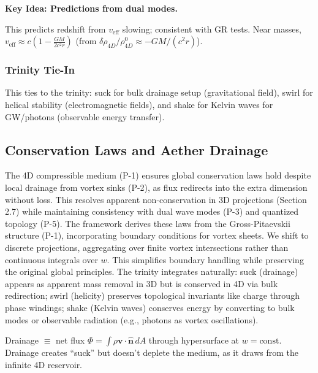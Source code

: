 \textbf{Key Idea: Predictions from dual modes.}

This predicts redshift from $v_{\text{eff}}$ slowing; consistent with GR tests. Near masses, $v_{\text{eff}} \approx c \left(1 - \frac{G M}{2 c^2 r}\right)$ (from $\delta \rho_{4D} / \rho_{4D}^0 \approx - G M / (c^2 r)$).

\subsubsection{Trinity Tie-In}

This ties to the trinity: suck for bulk drainage setup (gravitational field), swirl for helical stability (electromagnetic fields), and shake for Kelvin waves for GW/photons (observable energy transfer).


\subsection{Conservation Laws and Aether Drainage}

The 4D compressible medium (P-1) ensures global conservation laws hold despite local drainage from vortex sinks (P-2), as flux redirects into the extra dimension without loss. This resolves apparent non-conservation in 3D projections (Section 2.7) while maintaining consistency with dual wave modes (P-3) and quantized topology (P-5). The framework derives these laws from the Gross-Pitaevskii structure (P-1), incorporating boundary conditions for vortex sheets. We shift to discrete projections, aggregating over finite vortex intersections rather than continuous integrals over $w$. This simplifies boundary handling while preserving the original global principles. The trinity integrates naturally: suck (drainage) appears as apparent mass removal in 3D but is conserved in 4D via bulk redirection; swirl (helicity) preserves topological invariants like charge through phase windings; shake (Kelvin waves) conserves energy by converting to bulk modes or observable radiation (e.g., photons as vortex oscillations).

Drainage $\equiv$ net flux $\Phi = \int \rho \mathbf{v} \cdot \hat{\mathbf{n}} \, dA$ through hypersurface at $w = \text{const}$. Drainage creates ``suck'' but doesn't deplete the medium, as it draws from the infinite 4D reservoir.

